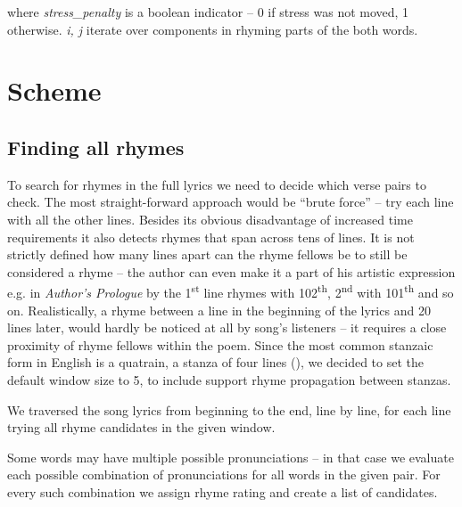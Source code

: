 where \textit{stress\_penalty} is a boolean indicator -- 0 if stress was not moved, 1 otherwise.
 \textit{i, j} iterate over components in rhyming parts of the both words.





\section{Scheme}
\subsection{Finding all rhymes}\label{finding-all-rhymes}
To search for rhymes in the full lyrics\added{,} we need to decide which verse pairs to check. The most straight-forward approach would be ``brute force'' -- try each line with all the other lines. Besides its obvious disadvantage of increased time requirements it also detects rhymes that span across tens of lines. It is not strictly defined how many lines apart can the rhyme fellows be to still be considered a rhyme -- the author can even make it a part of his artistic expression\added{,} e.g. in \textit{Author's Prologue} by \cite{thomas1952author} the 1\textsuperscript{st} line rhymes with 102\textsuperscript{th}, 2\textsuperscript{nd} with 101\textsuperscript{th} and so on. Realistically, a rhyme between a line in the beginning of the lyrics and 20 lines later, would hardly be noticed at all by song's listeners -- it requires a close proximity of rhyme fellows within the poem. Since the most common stanzaic form in English is a quatrain, a stanza of four lines (\cite{eastman1970norton}), we decided to set the default window size to 5, to include support  rhyme propagation between stanzas.

We traversed the song lyrics from beginning to the end, line by line, for each line trying all rhyme candidates in the given window.

Some words may have multiple possible pronunciations -- in that case we evaluate each possible combination of pronunciations for all words in the given pair. For every such combination we assign rhyme rating and create a list of candidates.

